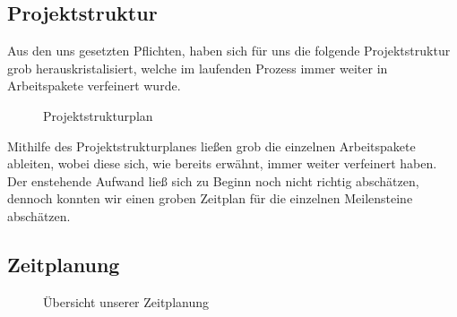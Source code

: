 \subsection{Projektstruktur} \label{Projektstruktur}

Aus den uns gesetzten Pflichten, haben sich für uns die folgende Projektstruktur grob herauskristalisiert, welche im laufenden Prozess immer weiter in Arbeitspakete verfeinert wurde.


\begin{center}
	\begin{figure}[h]
		 \noindent{}
		 \caption[Projektstrukturplan]{Projektstrukturplan} 

	\end{figure}
\end{center}

Mithilfe des Projektstrukturplanes ließen grob die einzelnen Arbeitspakete ableiten, wobei diese sich, wie bereits erwähnt, immer weiter verfeinert haben. Der enstehende Aufwand ließ sich zu Beginn noch nicht richtig abschätzen, dennoch konnten wir einen groben Zeitplan für die einzelnen Meilensteine abschätzen.


\subsection{Zeitplanung} \label{Zeitplanung}

\begin{center}
	\begin{figure}[h]

	 \noindent{}
	 \caption[Übersicht unserer Zeitplanung]{Übersicht unserer Zeitplanung}
	 \label{fig:zeitplanung}
	\end{figure}
\end{center}

